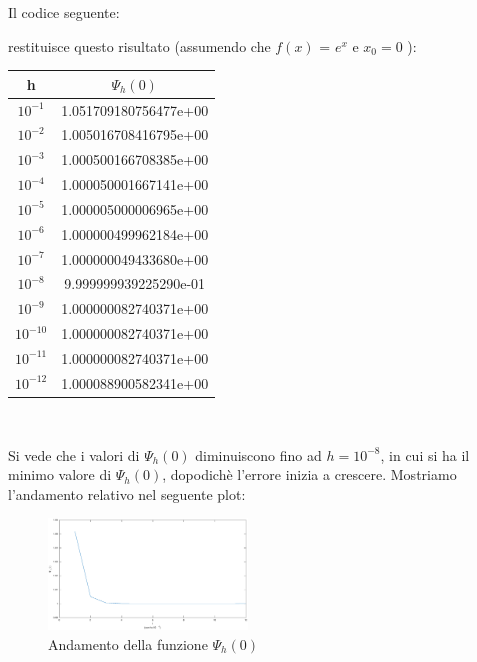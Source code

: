 \begin{flushleft}
Il codice seguente:

restituisce questo risultato (assumendo che $f(x)$ = $ e^x $ e $ x_0 = 0 $ ): 
\begin{center}
\begin{tabular}{|c|c|}
\hline
h & \( \Psi_{h}(0) \)  \\
\hline
    \(10^{-1}\) & 1.051709180756477e+00\\
    \(10^{-2}\) & 1.005016708416795e+00\\
    \(10^{-3}\) & 1.000500166708385e+00\\
    \(10^{-4}\) & 1.000050001667141e+00\\
    \(10^{-5}\) & 1.000005000006965e+00\\
    \(10^{-6}\) & 1.000000499962184e+00\\
    \(10^{-7}\) & 1.000000049433680e+00\\
    \(10^{-8}\) & 9.999999939225290e-01\\
    \(10^{-9}\) & 1.000000082740371e+00\\
    \(10^{-10}\) & 1.000000082740371e+00\\
    \(10^{-11}\) & 1.000000082740371e+00\\
    \(10^{-12}\) & 1.000088900582341e+00\\
\hline
\end{tabular} \\
\end{center}
Si vede che i valori di $\Psi_{h}(0)$ diminuiscono fino ad $h = 10^{-8}$, in cui si ha il minimo valore di $\Psi_{h}(0)$, dopodichè l'errore inizia a crescere. Mostriamo l'andamento relativo nel seguente plot:
\begin{figure}[H]
\label{fes14}
\includegraphics[left, width=200px]{plot/fes14}
\caption{Andamento della funzione $\Psi_{h}(0)$}
\end{figure}
\end{flushleft}